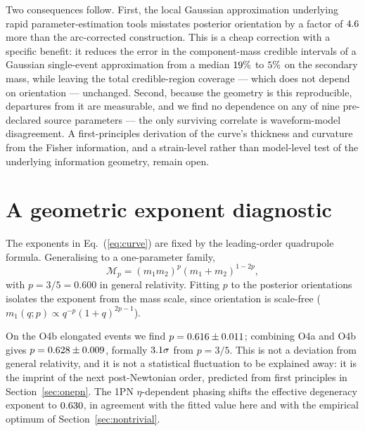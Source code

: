 \documentclass[aps,prd,twocolumn,amsmath,amssymb,nofootinbib,superscriptaddress]{revtex4-2}
\begin{document}
Two consequences follow. First, the local Gaussian approximation underlying rapid parameter-estimation
tools misstates posterior orientation by a factor of $4.6$ more than the arc-corrected
construction. This is a cheap correction with a specific benefit: it reduces the error in the
component-mass credible intervals of a Gaussian single-event approximation from a median $19\%$
to $5\%$ on the secondary mass, while leaving the total credible-region coverage --- which does
not depend on orientation --- unchanged. Second,
because the geometry is this reproducible, departures from it are measurable, and we find no dependence on
any of nine pre-declared source parameters --- the only surviving correlate is waveform-model disagreement.
A first-principles derivation of the curve's thickness and curvature from the Fisher information, and a
strain-level rather than model-level test of the underlying information geometry, remain open.

\appendix

\section{A geometric exponent diagnostic}
\label{app:exponent}
The exponents in Eq.~(\ref{eq:curve}) are fixed by the leading-order quadrupole formula. Generalising to a
one-parameter family,
\begin{equation}
\mathcal{M}_p = (m_1 m_2)^p (m_1+m_2)^{1-2p},
\end{equation}
with $p = 3/5 = 0.600$ in general relativity. Fitting $p$ to the posterior orientations isolates the exponent from the mass scale, since orientation
is scale-free ($m_1(q;p) \propto q^{-p}(1+q)^{2p-1}$).

On the O4b elongated events we find $p = 0.616 \pm 0.011$; combining O4a and O4b gives
$p = 0.628 \pm 0.009$, formally $3.1\sigma$ from $p=3/5$. This is not a deviation
from general relativity, and it is not a statistical fluctuation to be explained away: it is the imprint
of the next post-Newtonian order, predicted from first principles in Section~\ref{sec:onepn}. The 1PN
$\eta$-dependent phasing shifts the effective degeneracy exponent to $0.630$, in agreement with the
fitted value here and with the empirical optimum of Section~\ref{sec:nontrivial}.
\end{document}
